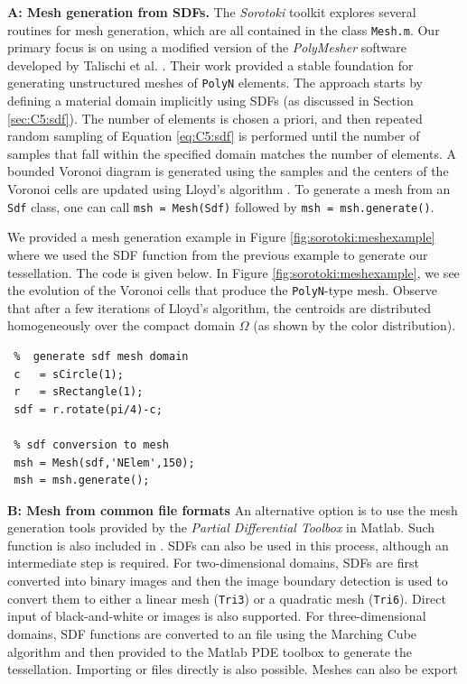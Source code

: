 \textbf{A: Mesh generation from SDFs.} The \textit{Sorotoki} toolkit explores several routines for mesh generation, which are all contained in the class \texttt{Mesh.m}. Our primary focus is on using a modified version of the \textit{PolyMesher} software developed by Talischi et al. \cite{Talischi2012Mar}. Their work provided a stable foundation for generating unstructured meshes of \texttt{PolyN} elements. The approach starts by defining a material domain implicitly using SDFs (as discussed in Section \ref{sec:C5:sdf}). The number of elements is chosen a priori, and then repeated random sampling of Equation \eqref{eq:C5:sdf} is performed until the number of samples that fall within the specified domain matches the number of elements. A bounded Voronoi diagram is generated using the samples and the centers of the Voronoi cells are updated using Lloyd's algorithm \cite{Lloyd1982Mar}. To generate a mesh from an \texttt{Sdf} class, one can call \texttt{msh = Mesh(Sdf)} followed by \texttt{msh = msh.generate()}.  \\

\begin{example}
We provided a mesh generation example in Figure \ref{fig:sorotoki:meshexample} where we used the SDF function from the previous example to generate our tessellation. The code is given below. In Figure \ref{fig:sorotoki:meshexample}, we see the evolution of the Voronoi cells that produce the \texttt{PolyN}-type mesh. Observe that after a few iterations of Lloyd's algorithm, the centroids are distributed homogeneously over the compact domain $\Omega$ (as shown by the color distribution).
%
\begin{lstlisting}[style=matlab] 
 %% EXAMPLE: Mesh class 
 %  generate sdf mesh domain 
 c   = sCircle(1);    
 r   = sRectangle(1);  
 sdf = r.rotate(pi/4)-c; 
    
 % sdf conversion to mesh 
 msh = Mesh(sdf,'NElem',150);
 msh = msh.generate();
\end{lstlisting}
%
\end{example}
%
\textbf{B: Mesh from common file formats} An alternative option is to use the mesh generation tools provided by the \textit{Partial Differential Toolbox} in Matlab. Such function is also included in . SDFs can also be used in this process, although an intermediate step is required. For two-dimensional domains, SDFs are first converted into binary images and then the image boundary detection is used to convert them to either a linear mesh (\texttt{Tri3}) or a quadratic mesh (\texttt{Tri6}). Direct input of black-and-white  or  images is also supported. For three-dimensional domains, SDF functions are converted to an  file using the Marching Cube algorithm \cite{Lorensen1987Aug} and then provided to the Matlab PDE toolbox to generate the tessellation. Importing  or  files directly is also possible. Meshes can also be export